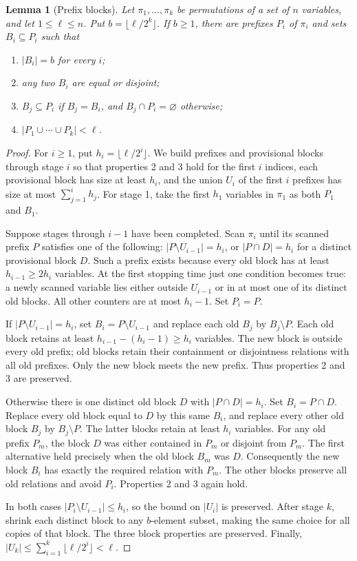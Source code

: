 \documentclass[11pt]{article}
\newtheorem{lemma}[theorem]{Lemma}
\theoremstyle{definition}
\theoremstyle{remark}
\begin{document}
\begin{lemma}[Prefix blocks]
\label{lem:prefix-blocks-parity}
Let $\pi_1,\ldots,\pi_k$ be permutations of a set of $n$ variables,
and let $1\le \ell\le n$.  Put $b=\lfloor\ell/2^k\rfloor$.
If $b\ge1$, there are prefixes $P_i$ of $\pi_i$ and sets $B_i\subseteq P_i$
such that
\begin{enumerate}
\item $|B_i|=b$ for every $i$;
\item any two $B_i$ are equal or disjoint;
\item $B_j\subseteq P_i$ if $B_j=B_i$, and
      $B_j\cap P_i=\varnothing$ otherwise;
\item $|P_1\cup\cdots\cup P_k|<\ell$.
\end{enumerate}
\end{lemma}
\begin{proof}
For $i\ge1$, put $h_i=\lfloor\ell/2^i\rfloor$.
We build prefixes and provisional blocks through stage $i$ so that
properties 2 and 3 hold for the first $i$ indices, each provisional
block has size at least $h_i$, and the union $U_i$ of the first $i$
prefixes has size at most $\sum_{j=1}^{i}h_j$.
For stage 1, take the first $h_1$ variables in $\pi_1$ as both $P_1$
and $B_1$.

Suppose stages through $i-1$ have been completed.
Scan $\pi_i$ until its scanned prefix $P$ satisfies one of the following:
$|P\setminus U_{i-1}|=h_i$, or
$|P\cap D|=h_i$ for a distinct provisional block $D$.
Such a prefix exists because every old block has at least
$h_{i-1}\ge2h_i$ variables.  At the first stopping time just one
condition becomes true: a newly scanned variable lies either outside
$U_{i-1}$ or in at most one of its distinct old blocks.
All other counters are at most $h_i-1$.
Set $P_i=P$.

If $|P\setminus U_{i-1}|=h_i$, set $B_i=P\setminus U_{i-1}$ and
replace each old $B_j$ by $B_j\setminus P$.
Each old block retains at least
$h_{i-1}-(h_i-1)\ge h_i$ variables.
The new block is outside every old prefix; old blocks retain their
containment or disjointness relations with all old prefixes.
Only the new block meets the new prefix.
Thus properties 2 and 3 are preserved.

Otherwise there is one distinct old block $D$ with $|P\cap D|=h_i$.
Set $B_i=P\cap D$.  Replace every old block equal to $D$ by this same
$B_i$, and replace every other old block $B_j$ by $B_j\setminus P$.
The latter blocks retain at least $h_i$ variables.
For any old prefix $P_m$, the block $D$ was either contained in $P_m$
or disjoint from $P_m$.  The first alternative held precisely when
the old block $B_m$ was $D$.  Consequently the new block $B_i$ has
exactly the required relation with $P_m$.
The other blocks preserve all old relations and avoid $P_i$.
Properties 2 and 3 again hold.

In both cases $|P_i\setminus U_{i-1}|\le h_i$, so the bound on $|U_i|$
is preserved.  After stage $k$, shrink each distinct block to any
$b$-element subset, making the same choice for all copies of that
block.  The three block properties are preserved.  Finally,
$|U_k|\le\sum_{i=1}^{k}\lfloor\ell/2^i\rfloor<\ell$.
\end{proof}
\end{document}

